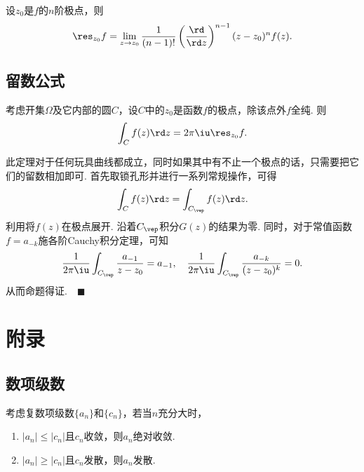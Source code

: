   \begin{thm}[留数的计算]
    设$z_0$是$f$的$n$阶极点，则
    \[
      \res_{z_0}f = \lim_{z\to z_0}\frac{1}{(n-1)!}
      \left(\frac{\rd}{\rd z}\right)^{n-1}(z-z_0)^nf(z).
    \]
  \end{thm}


\subsection{留数公式}
  \begin{thm}[留数公式]
    考虑开集$\Omega$及它内部的圆$C$，设$C$中的$z_0$是函数$f$的极点，除该点外$f$全纯. 则
    \begin{equation}
      \label{equ: 留数公式}
      \int_C f(z)\rd z = 2\pi\iu\res_{z_0}f.
    \end{equation}
  \end{thm}
  \remark
    此定理对于任何玩具曲线都成立，同时如果其中有不止一个极点的话，只需要把它们的留数相加即可.
  \proof
    首先取锁孔形并进行一系列常规操作，可得
    \[
      \int_{C}f(z)\rd z = \int_{C_\vep} f(z)\rd z.
    \]
    利用将$f(z)$在极点展开. 沿着$C_\vep$积分$G(z)$的结果为零.
    同时，对于常值函数$f=a_{-k}$施各阶Cauchy积分定理，可知
    \[
      \frac{1}{2\pi\iu}\int_{C_\vep}\frac{a_{-1}}{z-z_0}=a_{-1},\quad
      \frac{1}{2\pi\iu}\int_{C_\vep}\frac{a_{-k}}{(z-z_0)^k}=0.
    \]
    从而命题得证.$\quad\blacksquare$

  


\subsection{}

\newpage
\section{附录}

\subsection{数项级数}

  \begin{thm}
    考虑复数项级数$\{a_n\}$和$\{c_n\}$，若当$n$充分大时，
    \begin{enumerate}
      \item $|a_n| \le |c_n|$且$c_n$收敛，则$a_n$绝对收敛.
      \item $|a_n| \ge |c_n|$且$c_n$发散，则$a_n$发散.
    \end{enumerate}
  \end{thm}

